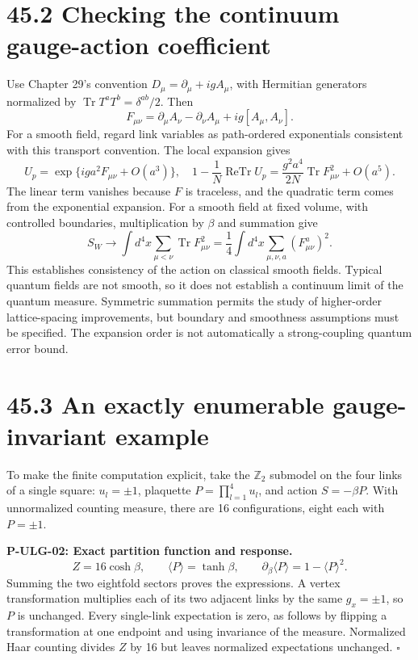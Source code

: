 \documentclass[
  11pt,
  oneside]{book}
\begin{document}
\section{45.2 Checking the continuum gauge-action coefficient}

Use Chapter 29's convention \(D_\mu=\partial_\mu+igA_\mu\), with
Hermitian generators normalized by
\(\operatorname{Tr}T^aT^b=\delta^{ab}/2\). Then \[
F_{\mu\nu}=\partial_\mu A_\nu-\partial_\nu A_\mu+ig[A_\mu,A_\nu].
\] For a smooth field, regard link variables as path-ordered
exponentials consistent with this transport convention. The local
expansion gives \[
U_p=\exp\{iga^2F_{\mu\nu}+O(a^3)\},\quad
1-\frac1N\operatorname{ReTr}U_p
=\frac{g^2a^4}{2N}\operatorname{Tr}F_{\mu\nu}^2+O(a^5).
\] The linear term vanishes because \(F\) is traceless, and the
quadratic term comes from the exponential expansion. For a smooth field
at fixed volume, with controlled boundaries, multiplication by \(\beta\)
and summation give \[
S_W\longrightarrow\int d^4x\sum_{\mu<\nu}\operatorname{Tr}F_{\mu\nu}^2
=\frac14\int d^4x\sum_{\mu,\nu,a}(F_{\mu\nu}^a)^2.
\] This establishes consistency of the action on classical smooth
fields. Typical quantum fields are not smooth, so it does not establish
a continuum limit of the quantum measure. Symmetric summation permits
the study of higher-order lattice-spacing improvements, but boundary and
smoothness assumptions must be specified. The expansion order is not
automatically a strong-coupling quantum error bound.

\section{45.3 An exactly enumerable gauge-invariant example}

To make the finite computation explicit, take the \(\mathbb Z_2\)
submodel on the four links of a single square: \(u_l=\pm1\), plaquette
\(P=\prod_{l=1}^4u_l\), and action \(S=-\beta P\). With unnormalized
counting measure, there are 16 configurations, eight each with
\(P=\pm1\).

\label{p-ulg-02}{}

\textbf{P-ULG-02: Exact partition function and response.} \[
Z=16\cosh\beta,\qquad \langle P\rangle=\tanh\beta,
\qquad\partial_\beta\langle P\rangle=1-\langle P\rangle^2.
\] Summing the two eightfold sectors proves the expressions. A vertex
transformation multiplies each of its two adjacent links by the same
\(g_x=\pm1\), so \(P\) is unchanged. Every single-link expectation is
zero, as follows by flipping a transformation at one endpoint and using
invariance of the measure. Normalized Haar counting divides \(Z\) by 16
but leaves normalized expectations unchanged. \(\square\)
\end{document}
